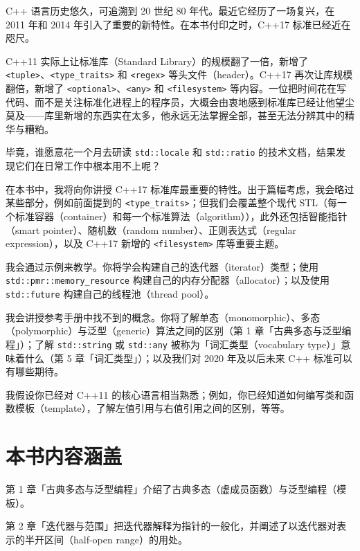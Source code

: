 C++ 语言历史悠久，可追溯到 20 世纪 80 年代。最近它经历了一场复兴，在 2011 年和 2014 年引入了重要的新特性。在本书付印之时，C++17 标准已经近在咫尺。

C++11 实际上让标准库（Standard Library）的规模翻了一倍，新增了 \texttt{<tuple>\allowbreak{}}、\texttt{<type\_\allowbreak{}traits>\allowbreak{}} 和 \texttt{<regex>\allowbreak{}} 等头文件（header）。C++17 再次让库规模翻倍，新增了 \texttt{<optional>\allowbreak{}}、\texttt{<any>\allowbreak{}} 和 \texttt{<filesystem>\allowbreak{}} 等内容。一位把时间花在写代码、而不是关注标准化进程上的程序员，大概会由衷地感到标准库已经让他望尘莫及——库里新增的东西实在太多，他永远无法掌握全部，甚至无法分辨其中的精华与糟粕。

毕竟，谁愿意花一个月去研读 \texttt{std::\allowbreak{}locale} 和 \texttt{std::\allowbreak{}ratio} 的技术文档，结果发现它们在日常工作中根本用不上呢？

在本书中，我将向你讲授 C++17 标准库最重要的特性。出于篇幅考虑，我会略过某些部分，例如前面提到的 \texttt{<type\_\allowbreak{}traits>\allowbreak{}}；但我们会覆盖整个现代 STL（每一个标准容器（container）和每一个标准算法（algorithm）），此外还包括智能指针（smart pointer）、随机数（random number）、正则表达式（regular expression），以及 C++17 新增的 \texttt{<filesystem>\allowbreak{}} 库等重要主题。

我会通过示例来教学。你将学会构建自己的迭代器（iterator）类型；使用 \texttt{std::\allowbreak{}pmr::\allowbreak{}memory\_\allowbreak{}resource} 构建自己的内存分配器（allocator）；以及使用 \texttt{std::\allowbreak{}future} 构建自己的线程池（thread pool）。

我会讲授参考手册中找不到的概念。你将了解单态（monomorphic）、多态（polymorphic）与泛型（generic）算法之间的区别（第 1 章「古典多态与泛型编程」）；了解 \texttt{std::\allowbreak{}string} 或 \texttt{std::\allowbreak{}any} 被称为「词汇类型（vocabulary type）」意味着什么（第 5 章「词汇类型」）；以及我们对 2020 年及以后未来 C++ 标准可以有哪些期待。

我假设你已经对 C++11 的核心语言相当熟悉；例如，你已经知道如何编写类和函数模板（template），了解左值引用与右值引用之间的区别，等等。

\section{本书内容涵盖}

第 1 章「古典多态与泛型编程」介绍了古典多态（虚成员函数）与泛型编程（模板）。

第 2 章「迭代器与范围」把迭代器解释为指针的一般化，并阐述了以迭代器对表示的半开区间（half-open range）的用处。

